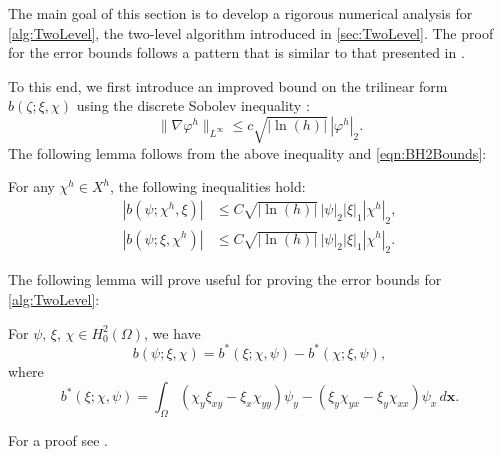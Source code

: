 The main goal of this section is to develop a rigorous numerical analysis for
\autoref{alg:TwoLevel}, the two-level algorithm introduced in
\autoref{sec:TwoLevel}. The proof for the error bounds follows a pattern that is
similar to that presented in \cite{Fairag98}.

To this end, we first introduce an improved bound on the trilinear form
$b(\zeta; \xi, \chi)$ using the discrete Sobolev inequality
\cite{Ciarlet,Fairag98}:
\begin{equation*}
  \|\nabla \varphi^h\|_{L^{\infty}} \le c \sqrt{|\ln(h)|}\, |\varphi^h|_2.
\end{equation*}
The following lemma follows from the above inequality and \eqref{eqn:BH2Bounds}:
\begin{lemma} \label{lma:bImproved}
  For any $\chi^h\in X^h$, the following inequalities hold:
  \begin{align*}
    |b(\psi;\chi^h,\xi)| &\le C\sqrt{|\ln(h)|} \, |\psi|_2 |\xi|_1 |\chi^h|_2, \\
    |b(\psi;\xi,\chi^h)| &\le C\sqrt{|\ln(h)|} \, |\psi|_2 |\xi|_1 |\chi^h|_2.
  \end{align*}
\end{lemma}
The following lemma will prove useful for proving the error bounds for
\autoref{alg:TwoLevel}:
\begin{lemma} \label{lma:trilinear}
  For $\psi,\,\xi,\,\chi\in H^2_0(\Omega)$, we have
  \begin{equation}
    b(\psi; \xi, \chi) = b^*(\xi; \chi, \psi) - b^*(\chi; \xi, \psi),
    \label{eqn:eqn:trilinear}
  \end{equation}
  where
  \begin{equation}
    b^*(\xi; \chi, \psi) = \int_{\Omega}\! (\chi_y\xi_{xy}-\xi_x\chi_{yy}) \psi_y -
    (\xi_y\chi_{yx}-\xi_y\chi_{xx}) \psi_x \,d\mathbf{x}.
    \label{eqn:trilinear}
  \end{equation}
\end{lemma}
For a proof see \cite{Fairag98}.

